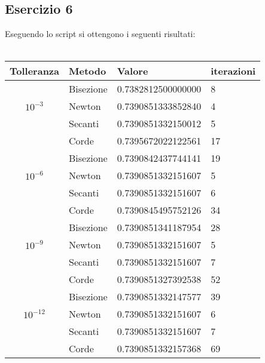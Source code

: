 \subsection{Esercizio 6}

Eseguendo lo script si ottengono i seguenti risultati:\\\\
\begin{tabular}{|c|l|l|l|}
        \hline
        Tolleranza & Metodo & Valore & iterazioni \\
        \hline
        & Bisezione &  0.7382812500000000 & 8\\ \cline{2-4}
        $10^{-3}$  & Newton & 0.7390851333852840 & 4\\ \cline{2-4}
        & Secanti &  0.7390851332150012 & 5\\ \cline{2-4}
        & Corde & 0.7395672022122561 &  17\\ \cline{2-4}
        \hline
        & Bisezione &  0.7390842437744141 & 19\\ \cline{2-4}
        $10^{-6}$ & Newton & 0.7390851332151607 &  5\\ \cline{2-4}
        & Secanti &  0.7390851332151607 & 6\\ \cline{2-4}
        & Corde &  0.7390845495752126 &  34 \\ \cline{2-4}
        \hline
        & Bisezione & 0.7390851341187954 & 28\\ \cline{2-4}
        $10^{-9}$ & Newton & 0.7390851332151607 &  5\\ \cline{2-4}
        & Secanti & 0.7390851332151607 & 7\\ \cline{2-4}
        & Corde &  0.7390851327392538 &  52 \\ \cline{2-4}
        \hline
        & Bisezione &  0.7390851332147577 & 39\\ \cline{2-4}
        $10^{-12}$ & Newton &  0.7390851332151607 &  6\\ \cline{2-4}
        & Secanti &   0.7390851332151607 & 7\\ \cline{2-4}
        & Corde &   0.7390851332157368 &  69 \\ \cline{2-4}
        \hline
\end{tabular}

